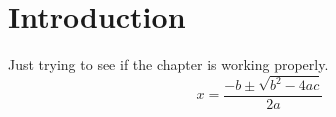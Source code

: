 \documentclass{report}
\begin{document}
\chapter{Introduction}
Just trying to see if the chapter is working properly.
\[ x = \frac{-b \pm \sqrt{b^2 - 4ac}}{2a} \]
\end{document}
